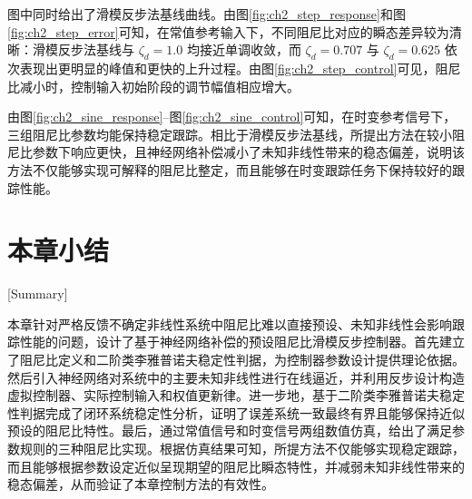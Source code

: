 图中同时给出了滑模反步法基线曲线。由图\ref{fig:ch2_step_response}和图\ref{fig:ch2_step_error}可知，在常值参考输入下，不同阻尼比对应的瞬态差异较为清晰：滑模反步法基线与 $\zeta_d=1.0$ 均接近单调收敛，而 $\zeta_d=0.707$ 与 $\zeta_d=0.625$ 依次表现出更明显的峰值和更快的上升过程。由图\ref{fig:ch2_step_control}可见，阻尼比减小时，控制输入初始阶段的调节幅值相应增大。

\noindent

由图\ref{fig:ch2_sine_response}--图\ref{fig:ch2_sine_control}可知，在时变参考信号下，三组阻尼比参数均能保持稳定跟踪。相比于滑模反步法基线，所提出方法在较小阻尼比参数下响应更快，且神经网络补偿减小了未知非线性带来的稳态偏差，说明该方法不仅能够实现可解释的阻尼比整定，而且能够在时变跟踪任务下保持较好的跟踪性能。
\FloatBarrier
\section{本章小结}[Summary]\label{sec:ch3_summary}

本章针对严格反馈不确定非线性系统中阻尼比难以直接预设、未知非线性会影响跟踪性能的问题，设计了基于神经网络补偿的预设阻尼比滑模反步控制器。首先建立了阻尼比定义和二阶类李雅普诺夫稳定性判据，为控制器参数设计提供理论依据。然后引入神经网络对系统中的主要未知非线性进行在线逼近，并利用反步设计构造虚拟控制器、实际控制输入和权值更新律。进一步地，基于二阶类李雅普诺夫稳定性判据完成了闭环系统稳定性分析，证明了误差系统一致最终有界且能够保持近似预设的阻尼比特性。最后，通过常值信号和时变信号两组数值仿真，给出了满足参数规则的三种阻尼比实现。根据仿真结果可知，所提方法不仅能够实现稳定跟踪，而且能够根据参数设定近似呈现期望的阻尼比瞬态特性，并减弱未知非线性带来的稳态偏差，从而验证了本章控制方法的有效性。


